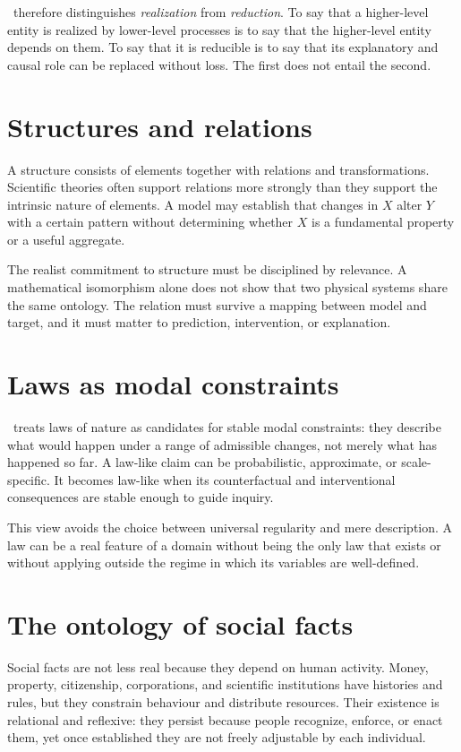 \RCR\ therefore distinguishes \emph{realization} from \emph{reduction}. To say
that a higher-level entity is realized by lower-level processes is to say that
the higher-level entity depends on them. To say that it is reducible is to say
that its explanatory and causal role can be replaced without loss. The first
does not entail the second.

\section{Structures and relations}

A structure consists of elements together with relations and transformations.
Scientific theories often support relations more strongly than they support
the intrinsic nature of elements. A model may establish that changes in \(X\)
alter \(Y\) with a certain pattern without determining whether \(X\) is a
fundamental property or a useful aggregate.

The realist commitment to structure must be disciplined by relevance. A
mathematical isomorphism alone does not show that two physical systems share
the same ontology. The relation must survive a mapping between model and
target, and it must matter to prediction, intervention, or explanation.

\section{Laws as modal constraints}

\RCR\ treats laws of nature as candidates for stable modal constraints: they
describe what would happen under a range of admissible changes, not merely what
has happened so far. A law-like claim can be probabilistic, approximate, or
scale-specific. It becomes law-like when its counterfactual and interventional
consequences are stable enough to guide inquiry.

This view avoids the choice between universal regularity and mere description.
A law can be a real feature of a domain without being the only law that exists
or without applying outside the regime in which its variables are well-defined.

\section{The ontology of social facts}

Social facts are not less real because they depend on human activity. Money,
property, citizenship, corporations, and scientific institutions have histories
and rules, but they constrain behaviour and distribute resources. Their
existence is relational and reflexive: they persist because people recognize,
enforce, or enact them, yet once established they are not freely adjustable by
each individual.

